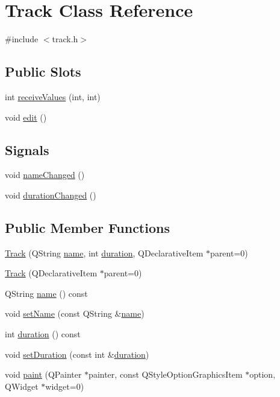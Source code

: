 \hypertarget{class_track}{\section{\-Track \-Class \-Reference}
\label{class_track}
}


{\ttfamily \#include $<$track.\-h$>$}

\subsection*{\-Public \-Slots}
\begin{DoxyCompactItemize}
\item 
int \hyperlink{class_track_a278781943f612432554c3ca2d00cc91b}{receive\-Values} (int, int)
\item 
void \hyperlink{class_track_a4f3866ef5530386df5a0edddd952855c}{edit} ()
\end{DoxyCompactItemize}
\subsection*{\-Signals}
\begin{DoxyCompactItemize}
\item 
void \hyperlink{class_track_a97e632553490ba9a006f786d5fef787d}{name\-Changed} ()
\item 
void \hyperlink{class_track_a15abbcbe88a1f96179f1d96d8d4444f3}{duration\-Changed} ()
\end{DoxyCompactItemize}
\subsection*{\-Public \-Member \-Functions}
\begin{DoxyCompactItemize}
\item 
\hyperlink{class_track_af5112d29fa80bc29272af65b6f08c977}{\-Track} (\-Q\-String \hyperlink{class_track_ab2a89648b1887bba5effc459f4a4d357}{name}, int \hyperlink{class_track_a84b1dd634704ec21c1e3eaab6a01d36b}{duration}, \-Q\-Declarative\-Item $\ast$parent=0)
\item 
\hyperlink{class_track_affa44d128caa9d15e26c16dfbb6ec7b2}{\-Track} (\-Q\-Declarative\-Item $\ast$parent=0)
\item 
\-Q\-String \hyperlink{class_track_a9f49d4308db610406640c6b905a599ee}{name} () const 
\item 
void \hyperlink{class_track_a7f403ec64013e861f1c5fcbb7816a1e7}{set\-Name} (const \-Q\-String \&\hyperlink{class_track_ab2a89648b1887bba5effc459f4a4d357}{name})
\item 
int \hyperlink{class_track_ae667aba1aeb758a45f3e9620700caa52}{duration} () const 
\item 
void \hyperlink{class_track_ac43814b6fb60249f2640d2a96e9607b1}{set\-Duration} (const int \&\hyperlink{class_track_a84b1dd634704ec21c1e3eaab6a01d36b}{duration})
\item 
void \hyperlink{class_track_ab14ea443d2e5f012abb50acb94528063}{paint} (\-Q\-Painter $\ast$painter, const \-Q\-Style\-Option\-Graphics\-Item $\ast$option, \-Q\-Widget $\ast$widget=0)
\end{DoxyCompactItemize}
